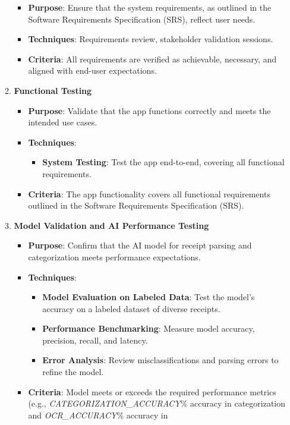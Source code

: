 \documentclass[12pt, titlepage]{article}
\begin{document}
\begin{enumerate}
\begin{enumerate}
		\begin{itemize}
			\item \textbf{Purpose}: Ensure that the system requirements, as outlined in the Software Requirements Specification (SRS), reflect user needs.
			\item \textbf{Techniques}: Requirements review, stakeholder validation sessions.
			\item \textbf{Criteria}: All requirements are verified as achievable, necessary, and aligned with end-user expectations.
		\end{itemize}
		\item \textbf{Functional Testing}
		\begin{itemize}
			\item \textbf{Purpose}: Validate that the app functions correctly and meets the intended use cases.
			\item \textbf{Techniques}:
			\begin{itemize}
				\item \textbf{System Testing}: Test the app end-to-end, covering all functional requirements.
			\end{itemize}
			\item \textbf{Criteria}: The app functionality covers all functional requirements outlined in the Software Requirements Specification (SRS).
		\end{itemize}
		\item \textbf{Model Validation and AI Performance Testing}
		\begin{itemize}
			\item \textbf{Purpose}: Confirm that the AI model for receipt parsing and categorization meets performance expectations.
			\item \textbf{Techniques}:
			\begin{itemize}
				\item \textbf{Model Evaluation on Labeled Data}: Test the model's accuracy on a labeled dataset of diverse receipts.
				\item \textbf{Performance Benchmarking}: Measure model accuracy, precision, recall, and latency.
				\item \textbf{Error Analysis}: Review misclassifications and parsing errors to refine the model.
			\end{itemize}
			\item \textbf{Criteria}: Model meets or exceeds the required
			performance metrics (e.g., \textit{CATEGORIZATION\_ACCURACY}\%
			accuracy in categorization and \textit{OCR\_ACCURACY}\% accuracy in

\end{itemize}
\end{enumerate}
\end{enumerate}
\end{document}
